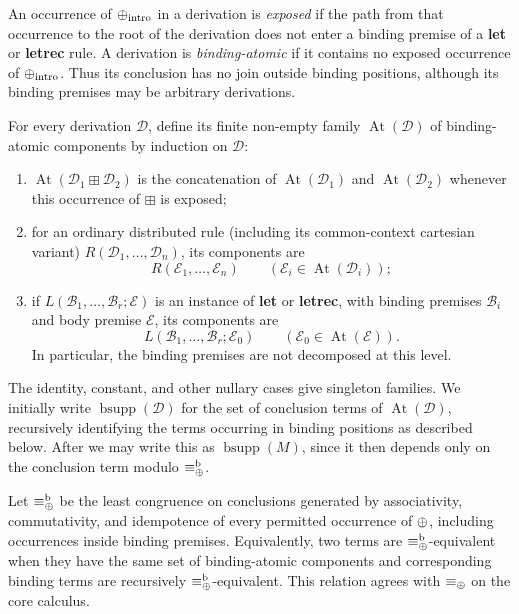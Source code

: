 \begin{definition}
\label{def:binding_atomic}
An occurrence of $\mathbin{\oplus}_{\mathrm{intro}}$ in a derivation is \emph{exposed} if the
path from that occurrence to the root of the derivation does not enter a
binding premise of a \textbf{let} or \textbf{letrec} rule.  A derivation is
\emph{binding-atomic} if it contains no exposed occurrence of
$\mathbin{\oplus}_{\mathrm{intro}}$.  Thus its conclusion has no join outside binding
positions, although its binding premises may be arbitrary derivations.

For every derivation $\mathcal{D}$, define its finite non-empty family
$\operatorname{At}(\mathcal{D})$ of binding-atomic components by induction on
$\mathcal{D}$:
\begin{enumerate}
  \item
  $\operatorname{At}(\mathcal{D}_1 \boxplus \mathcal{D}_2)$ is the
  concatenation of $\operatorname{At}(\mathcal{D}_1)$ and
  $\operatorname{At}(\mathcal{D}_2)$ whenever this occurrence of
  $\boxplus$ is exposed;
  \item
  for an ordinary distributed rule (including its common-context cartesian
  variant)
  $R(\mathcal{D}_1,\ldots,\mathcal{D}_n)$, its components are
  \[
  R(\mathcal{E}_1,\ldots,\mathcal{E}_n)
  \qquad
  (\mathcal{E}_i\in\operatorname{At}(\mathcal{D}_i));
  \]
  \item
  if $L(\mathcal{B}_1,\ldots,\mathcal{B}_r;\mathcal{E})$ is an instance of
  \textbf{let} or \textbf{letrec}, with binding premises
  $\mathcal{B}_i$ and body premise $\mathcal{E}$, its components are
  \[
  L(\mathcal{B}_1,\ldots,\mathcal{B}_r;\mathcal{E}_0)
  \qquad
  (\mathcal{E}_0\in\operatorname{At}(\mathcal{E})).
  \]
  In particular, the binding premises are not decomposed at this level.
\end{enumerate}
The identity, constant, and other nullary cases give singleton families.
We initially write $\operatorname{bsupp}(\mathcal D)$ for the set of
conclusion terms of $\operatorname{At}(\mathcal D)$, recursively identifying
the terms occurring in binding positions as described below.  After
 we may write this as
$\operatorname{bsupp}(M)$, since it then depends only on the conclusion term
modulo $\equiv_{\mathbin{\oplus}}^{\mathrm b}$.
\end{definition}

Let $\equiv_{\mathbin{\oplus}}^{\mathrm b}$ be the least congruence on conclusions generated
by associativity, commutativity, and idempotence of every permitted occurrence
of $\mathbin{\oplus}$, including occurrences inside binding premises.  Equivalently, two
terms are $\equiv_{\mathbin{\oplus}}^{\mathrm b}$-equivalent when they have the same set of
binding-atomic components and corresponding binding terms are recursively
$\equiv_{\mathbin{\oplus}}^{\mathrm b}$-equivalent.  This relation agrees with
$\equiv_{\mathbin{\oplus}}$ on the core calculus.

